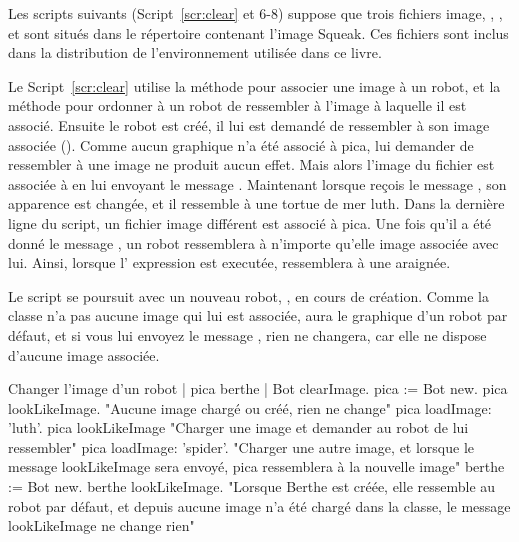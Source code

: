 \documentclass[a4paper,10pt,twoside]{book}
\begin{document}
Les scripts suivants (Script~\ref{scr:clear} et 6-8) suppose que trois fichiers image, , 
, et  sont situ\'es dans le r\'epertoire contenant l'image Squeak. Ces 
fichiers sont inclus dans la distribution de l'environnement utilis\'ee dans ce livre. 

Le Script~\ref{scr:clear} utilise la m\'ethode  pour associer une image \`a un robot, et la m\'ethode 
 pour ordonner \`a un robot de ressembler \`a l'image \`a laquelle il est associ\'e. Ensuite le robot 
 est cr\'e\'e, il lui est demand\'e de ressembler \`a son image associ\'ee (). Comme 
aucun graphique n'a \'et\'e associ\'e \`a pica, lui demander de ressembler \`a une image ne produit aucun 
effet. Mais alors l'image du fichier   est associ\'ee \`a  en lui envoyant le message 
. Maintenant lorsque  reçois le message , son 
apparence est chang\'ee, et il ressemble \`a une tortue de mer luth. Dans la derni\`ere ligne du script,
 un fichier image diff\'erent est associ\'e \`a pica. Une fois qu'il a \'et\'e donn\'e le message 
 , un robot ressemblera \`a n'importe qu'elle image associ\'ee avec lui. 
 Ainsi, lorsque l' expression  est execut\'ee,  ressemblera \`a une araign\'ee.

Le script se poursuit avec un nouveau robot, , en cours de cr\'eation. Comme la classe  
n'a pas aucune image qui lui est associ\'ee,  aura le graphique d'un robot par d\'efaut, et si vous 
lui envoyez le message , rien ne changera, car elle ne dispose d'aucune image associ\'ee.


\begin{script}[clear]{Changer l'image d'un robot}
	| pica berthe | 
	Bot clearImage. 
	pica := Bot new. 
	pica lookLikeImage. 
	"Aucune image charg\'e ou cr\'e\'e, rien ne change" 
	pica loadImage: 'luth'. 
	pica lookLikeImage 
	"Charger une image et demander au robot de lui ressembler" 
	pica loadImage: 'spider'. 
	"Charger une autre image, et lorsque le message lookLikeImage sera envoy\'e, pica ressemblera \`a la nouvelle image" 
	berthe := Bot new. 
	berthe lookLikeImage. 
	"Lorsque Berthe est cr\'e\'ee, elle ressemble au robot par d\'efaut, et depuis aucune image n'a \'et\'e charg\'e 
	dans la classe, le message lookLikeImage ne change rien"
\end{script}
\end{document}
